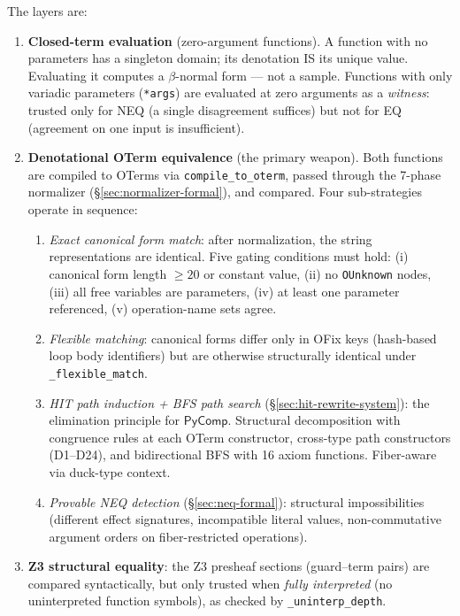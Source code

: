 The layers are:

\begin{enumerate}
  \item[\textbf{$\pi_0$}:] \textbf{Closed-term evaluation}
    (zero-argument functions).
    A function with no parameters has a singleton domain; its
    denotation IS its unique value.  Evaluating it computes
    a $\beta$-normal form --- not a sample.  Functions with only
    variadic parameters (\texttt{*args}) are evaluated at zero
    arguments as a \emph{witness}: trusted only for NEQ (a single
    disagreement suffices) but not for EQ (agreement on one input
    is insufficient).

  \item[\textbf{$\pi_1$}:] \textbf{Denotational OTerm equivalence}
    (the primary weapon).  Both functions are compiled to OTerms
    via \texttt{compile\_to\_oterm}, passed through the 7-phase
    normalizer (\S\ref{sec:normalizer-formal}), and compared.
    Four sub-strategies operate in sequence:
    \begin{enumerate}[label=(\alph*)]
      \item \emph{Exact canonical form match}: after normalization,
        the string representations are identical.  Five gating
        conditions must hold: (i) canonical form length $\geq 20$
        or constant value, (ii) no \texttt{OUnknown} nodes, (iii)
        all free variables are parameters, (iv) at least one
        parameter referenced, (v) operation-name sets agree.
      \item \emph{Flexible matching}: canonical forms differ only
        in OFix keys (hash-based loop body identifiers) but are
        otherwise structurally identical under
        \texttt{\_flexible\_match}.
      \item \emph{HIT path induction + BFS path search}
        (\S\ref{sec:hit-rewrite-system}): the elimination
        principle for $\mathsf{PyComp}$.  Structural decomposition
        with congruence rules at each OTerm constructor, cross-type
        path constructors (D1--D24), and bidirectional BFS with
        16 axiom functions.  Fiber-aware via duck-type context.
      \item \emph{Provable NEQ detection}
        (\S\ref{sec:neq-formal}): structural impossibilities
        (different effect signatures, incompatible literal values,
        non-commutative argument orders on fiber-restricted
        operations).
    \end{enumerate}

  \item[\textbf{$\pi_2$}:] \textbf{Z3 structural equality}: the
    Z3 presheaf sections (guard--term pairs) are compared
    syntactically, but only trusted when \emph{fully interpreted}
    (no uninterpreted function symbols), as checked by
    \texttt{\_uninterp\_depth}.


\end{enumerate}
